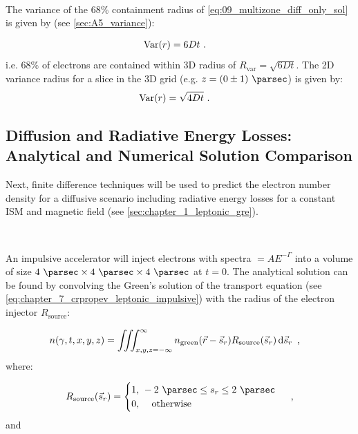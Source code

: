 \par~\par 
The variance of the $68\%$ containment radius of \autoref{eq:09_multizone_diff_only_sol} is given by (see \autoref{sec:A5_variance}):

\begin{equation}
	\begin{aligned}
		\mathrm{Var}\qty(r)&=6Dt\text{ .} 
	\end{aligned}
\end{equation}
\noindent i.e. $68\%$ of electrons are contained within 3D radius of $R_\text{var}=\sqrt{6Dt}$. The 2D variance radius for a slice in the 3D grid (e.g. $z=(0\pm 1)~\pc$) is given by:
\begin{equation}
	\begin{aligned}
		\mathrm{Var}\qty(r)&=\sqrt{4Dt}\text{ .} 
	\end{aligned}
\end{equation}


\subsection{Diffusion and Radiative Energy Losses: Analytical and Numerical Solution Comparison}

Next, finite difference techniques will be used to predict the electron number density for a diffusive scenario including radiative energy losses for a constant ISM and magnetic field (see \autoref{sec:chapter_1_leptonic_gre}).
\par~\par
An impulsive accelerator will inject electrons with spectra $=AE^{-\Gamma}$ into a volume of size $4~\pc \times 4~\pc \times 4~\pc$ at $t=0$. The analytical solution can be found by convolving the Green's solution of the transport equation (see \autoref{eq:chapter_7_crpropev_leptonic_impulsive}) with the radius of the electron injector $R_\text{source}$:

\begin{equation}
	\begin{aligned}
		n\qty(\gamma,t,x,y,z)&=\iiint_{x,y,z=-\infty}^{\infty} n_\text{green}\qty(\vec{r}-\vec{s}_r)R_\text{source}\qty(\vec{s}_r)\dd{\vec{s}_r} \text{ ,} 
	\end{aligned} \label{eq:chapter_9_multizone_diff_exact}
\end{equation}
\noindent where:

\begin{equation}
    \begin{aligned}
    R_\text{source}\qty(\vec{s}_r)=
    \begin{cases}
    1\text{, }-2~\pc\leq s_r\leq 2~\pc \\
    0\text{, }\quad\text{otherwise}
    \end{cases}\text{ ,} 
    \end{aligned} \label{eq:09_multizone_source_func}
\end{equation}
\noindent and

